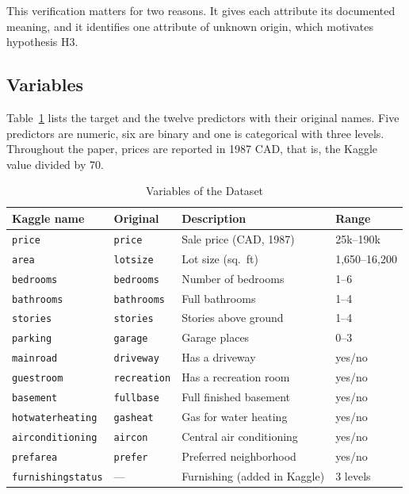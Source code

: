\documentclass[conference]{IEEEtran}
\begin{document}
This verification matters for two reasons. It gives each attribute its documented meaning, and it identifies one attribute of unknown origin, which motivates hypothesis H3.

\subsection{Variables}

Table~\ref{tab:variables} lists the target and the twelve predictors with their original names. Five predictors are numeric, six are binary and one is categorical with three levels. Throughout the paper, prices are reported in 1987 CAD, that is, the Kaggle value divided by 70.

\begin{table}[t]
\caption{Variables of the Dataset}
\label{tab:variables}
\centering
\footnotesize
\setlength{\tabcolsep}{3pt}
\begin{tabular}{@{}llp{2.75cm}l@{}}
\toprule
Kaggle name & Original & Description & Range \\
\midrule
\texttt{price} & \texttt{price} & Sale price (CAD, 1987) & 25k--190k \\
\texttt{area} & \texttt{lotsize} & Lot size (sq.\ ft) & 1,650--16,200 \\
\texttt{bedrooms} & \texttt{bedrooms} & Number of bedrooms & 1--6 \\
\texttt{bathrooms} & \texttt{bathrooms} & Full bathrooms & 1--4 \\
\texttt{stories} & \texttt{stories} & Stories above ground & 1--4 \\
\texttt{parking} & \texttt{garage} & Garage places & 0--3 \\
\texttt{mainroad} & \texttt{driveway} & Has a driveway & yes/no \\
\texttt{guestroom} & \texttt{recreation} & Has a recreation room & yes/no \\
\texttt{basement} & \texttt{fullbase} & Full finished basement & yes/no \\
\texttt{hotwaterheating} & \texttt{gasheat} & Gas for water heating & yes/no \\
\texttt{airconditioning} & \texttt{aircon} & Central air conditioning & yes/no \\
\texttt{prefarea} & \texttt{prefer} & Preferred neighborhood & yes/no \\
\texttt{furnishingstatus} & --- & Furnishing (added in Kaggle) & 3 levels \\
\bottomrule
\end{tabular}
\end{table}
\end{document}
